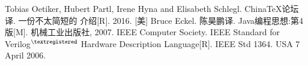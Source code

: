 \documentclass[utf-8, 10pt, a4paper, titlepage, oneside, onecolumn, openany]{ctexart} %
\begin{document}
	\clearpage

	\begin{thebibliography}{9} %
		 Tobias Oetiker, Hubert Partl, Irene Hyna and Elisabeth Schlegl. China\TeX 论坛译. 一份不太简短的 \LaTeXe 介绍[R]. 2016.
		 [美] Bruce Eckel. 陈昊鹏译. Java编程思想:第4版[M]. 机械工业出版社, 2007.
		 IEEE Computer Society. IEEE Standard for Verilog$^{\textregistered}$ Hardware Description Language[R]. IEEE Std 1364. USA 7 April 2006.
	\end{thebibliography}

	\clearpage

	\renewcommand{\listtablename}{代码索引} %
	\listoftables %

\end{document}
